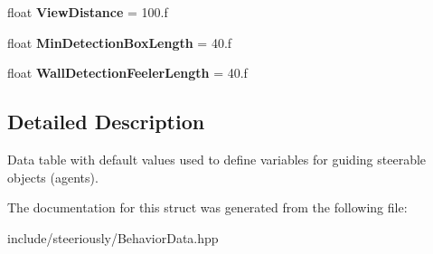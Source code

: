 \begin{DoxyCompactItemize}
\item 
\hypertarget{structsteer_1_1_behavior_parameters_a416529f35c516c3854c9309f5e3bda53}{float {\bfseries View\-Distance} = 100.f}\label{structsteer_1_1_behavior_parameters_a416529f35c516c3854c9309f5e3bda53}

\item 
\hypertarget{structsteer_1_1_behavior_parameters_a04178942eed91370ae2912c20f0b6f60}{float {\bfseries Min\-Detection\-Box\-Length} = 40.f}\label{structsteer_1_1_behavior_parameters_a04178942eed91370ae2912c20f0b6f60}

\item 
\hypertarget{structsteer_1_1_behavior_parameters_a6d3cf3e444e26f56f8e7bd97374ef114}{float {\bfseries Wall\-Detection\-Feeler\-Length} = 40.f}\label{structsteer_1_1_behavior_parameters_a6d3cf3e444e26f56f8e7bd97374ef114}

\end{DoxyCompactItemize}


\subsection{Detailed Description}
Data table with default values used to define variables for guiding steerable objects (agents). 

The documentation for this struct was generated from the following file\-:\begin{DoxyCompactItemize}
\item 
include/steeriously/Behavior\-Data.\-hpp\end{DoxyCompactItemize}
